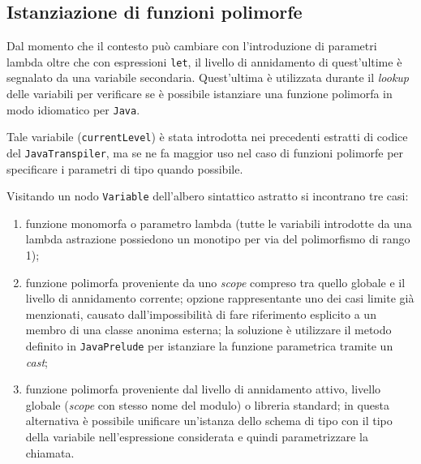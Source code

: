 \subsection{Istanziazione di funzioni polimorfe}
\label{sec:5-14-polymorphic-functions-instantiation}

Dal momento che il contesto può cambiare con l'introduzione di parametri lambda oltre che con espressioni \texttt{let},
il livello di annidamento di quest'ultime è segnalato da una variabile secondaria.
Quest'ultima è utilizzata durante il \textit{lookup}
delle variabili per verificare se è possibile istanziare una funzione polimorfa in modo idiomatico per \texttt{Java}.


Tale variabile (\texttt{currentLevel}) è stata introdotta nei precedenti estratti di codice del \texttt{JavaTranspiler},
ma se ne fa maggior uso nel caso di funzioni polimorfe per specificare i parametri di tipo quando possibile.

\noindent Visitando un nodo \texttt{Variable} dell'albero sintattico astratto si incontrano tre casi:
\begin{enumerate}
    \item funzione monomorfa o parametro lambda (tutte le variabili introdotte da una lambda astrazione
          possiedono un monotipo per via del polimorfismo di rango 1);
    \item funzione polimorfa proveniente da uno \textit{scope} compreso tra quello globale e il livello di annidamento corrente;
          opzione rappresentante uno dei casi limite già menzionati, causato dall'impossibilità di fare riferimento
          esplicito a un membro di una classe anonima esterna; la soluzione è utilizzare il metodo definito in \texttt{JavaPrelude}
          per istanziare la funzione parametrica tramite un \textit{cast};
    \item funzione polimorfa proveniente dal livello di annidamento attivo, livello globale
          (\textit{scope} con stesso nome del modulo) o libreria standard; in questa alternativa è possibile unificare un'istanza
          dello schema di tipo con il tipo della variabile nell'espressione considerata e quindi parametrizzare la chiamata.
\end{enumerate}

\newpage

